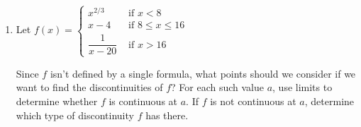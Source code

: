 \documentclass{article}
\begin{document}
\begin{enumerate}[resume]
  \begin{problem}[\vfill\newpage]
    Let $f(x) = \dfrac{x^2 + 2x}{|x|}$. Find all values of $x$ at which $f(x)$ is discontinuous. For each such value $a$, calculate $\displaystyle \lim_{x \to a^+} f(x)$ and $\displaystyle \lim_{x \to a^-} f(x)$, and use this to classify the discontinuity $a$. 
  \end{problem}

  \begin{solution}
    Since $f(x)$ is an algebraic formula, $f$ is only discontinuous when $f(x)$ is undefined.
    The only value where this occurs is $x=0$. Let's find the one-sided limits as $x \to 0$.

    As $x$ approaches $0$ from the left, since $x$ is negative, $|x| = -x$, so
    \begin{align*}
        \lim_{x\to 0^-} \frac{x^2+2x}{|x|} &= \lim_{x\to 0^-} \frac{x^2+2x}{-x} \\
        &= \lim_{x\to 0^-} -(x+2) \\
        &= -2.
    \end{align*}
    
    As $x$ approaches $0$ from the right, since $x$ is positive, $|x| = x$, so
    \begin{align*}
        \lim_{x\to 0^+} \frac{x^2+2x}{|x|} &= \lim_{x\to 0^+} \frac{x^2+2x}{x} \\
        &= \lim_{x\to 0^+} (x+2) \\
        &= 2.
    \end{align*}

    Since both one-sided limits exist but $\lim\limits_{x \to 0} f(x)$ does not exist,
    $x=0$ is a jump discontinuity.
    
  \end{solution}

\item 
  \begin{problem}[\vfill]
    Let $f(x) =
    \begin{cases}
      x^{2/3} & \text{ if } x < 8 \\
      x - 4 & \text{ if } 8 \leq x \leq 16 \\
      \dfrac{1}{x - 20} & \text{ if } x > 16
    \end{cases}$

    Since $f$ isn't defined by a single formula, what points should we consider if we want to find the discontinuities of $f$? For each such value $a$, use limits to determine whether $f$ is continuous at $a$. If $f$ is not continuous at $a$, determine which type of discontinuity $f$ has there.
  \end{problem}


\end{enumerate}
\end{document}
